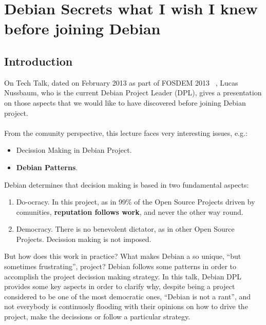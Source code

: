 \documentclass[11pt]{article}
\begin{document}
\pagebreak

\section{Debian Secrets what I wish I knew before joining Debian}
\label{sec:debiansecrets}
\subsection{Introduction}
On Tech Talk, dated on February 2013 as part of FOSDEM 2013 ~\cite{FOSS00}, Lucas Nussbaum, who is the current Debian Project Leader (DPL), gives a presentation on those aspects that we would like to have discovered before joining Debian project.\\
\\
From the comunity perspective, this lecture faces very interesting issues, e.g.:
\begin{itemize}
\item{Decission Making in Debian Project}.
\item{\textbf{Debian Patterns}}.
\end{itemize}
Debian determines that decision making is based in two fundamental aspects:
\begin{enumerate}\itemsep0pt
\item{Do-ocracy}. In this project, as in 99\% of the Open Source Projects driven by comunities, \textbf{reputation follows work}, and never the other way round.
\item{Democracy}. There is no benevolent dictator, as in other Open Source Projects. Decission making is not imposed.
\end{enumerate}

But how does this work in practice? What makes Debian a so unique, ``but sometimes frustrating'', project? Debian follows some patterns in order to accomplish the project decission making strategy. In this talk, Debian DPL provides some key aspects in order to clarify why, despite being a project considered to be one of the most democratic ones, ``Debian is not a rant'', and not everybody is continuosly flooding with their opinions on how to drive the project, make the decissions or follow a particular strategy.
\end{document}
